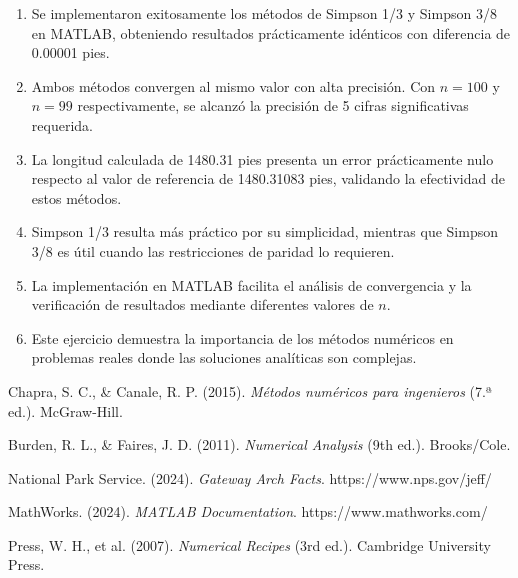 \documentclass[conference]{IEEEtran}
\begin{document}
\begin{enumerate}
    \item Se implementaron exitosamente los métodos de Simpson 1/3 y Simpson 3/8 en MATLAB, obteniendo resultados prácticamente idénticos con diferencia de 0.00001 pies.

    \item Ambos métodos convergen al mismo valor con alta precisión. Con $n=100$ y $n=99$ respectivamente, se alcanzó la precisión de 5 cifras significativas requerida.

    \item La longitud calculada de 1480.31 pies presenta un error prácticamente nulo respecto al valor de referencia de 1480.31083 pies, validando la efectividad de estos métodos.

    \item Simpson 1/3 resulta más práctico por su simplicidad, mientras que Simpson 3/8 es útil cuando las restricciones de paridad lo requieren.

    \item La implementación en MATLAB facilita el análisis de convergencia y la verificación de resultados mediante diferentes valores de $n$.

    \item Este ejercicio demuestra la importancia de los métodos numéricos en problemas reales donde las soluciones analíticas son complejas.
\end{enumerate}

\begin{thebibliography}{00}
 Chapra, S. C., \& Canale, R. P. (2015). \textit{Métodos numéricos para ingenieros} (7.ª ed.). McGraw-Hill.

 Burden, R. L., \& Faires, J. D. (2011). \textit{Numerical Analysis} (9th ed.). Brooks/Cole.

 National Park Service. (2024). \textit{Gateway Arch Facts}. https://www.nps.gov/jeff/

 MathWorks. (2024). \textit{MATLAB Documentation}. https://www.mathworks.com/

 Press, W. H., et al. (2007). \textit{Numerical Recipes} (3rd ed.). Cambridge University Press.
\end{thebibliography}
\end{document}
